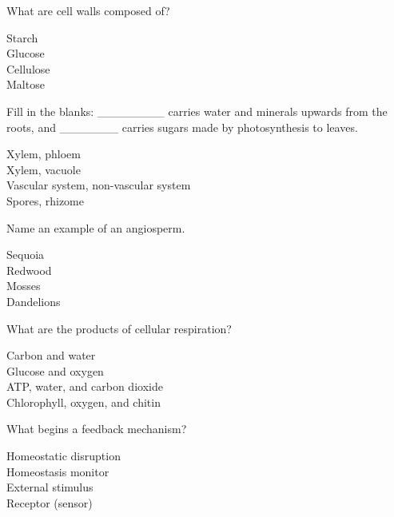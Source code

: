 \documentclass[a4paper,12pt]{exam}
\begin{document}
\begin{questions}
	\question What are cell walls composed of?
	
	\begin{oneparchoices}
		\choice Starch
		\\
		\choice Glucose
		\\
		\choice Cellulose
		\\
		\choice Maltose
	\end{oneparchoices}

	\question Fill in the blanks: \_\_\_\_\_\_\_\_  carries water and minerals upwards from the roots, and \_\_\_\_\_\_\_ carries sugars made by photosynthesis to leaves.
	
	\begin{oneparchoices}
		\choice Xylem, phloem
		\\
		\choice Xylem, vacuole
		\\
		\choice Vascular system, non-vascular system
		\\
		\choice Spores, rhizome
	\end{oneparchoices}

	
	\question Name an example of an angiosperm.
	
	\begin{oneparchoices}
		\choice Sequoia
		\\
		\choice Redwood
		\\
		\choice Mosses
		\\
		\choice Dandelions
	\end{oneparchoices}

	
	\question What are the products of cellular respiration?
	
	\begin{oneparchoices}
		\choice Carbon and water
		\\
		\choice Glucose and oxygen
		\\
		\choice ATP, water, and carbon dioxide
		\\
		\choice Chlorophyll, oxygen, and chitin
	\end{oneparchoices}
	
	\question What begins a feedback mechanism?
	
	\begin{oneparchoices}
		\choice Homeostatic disruption
		\\
		\choice Homeostasis monitor
		\\
		\choice External stimulus
		\\
		\choice Receptor (sensor)
	\end{oneparchoices}
\end{questions}
\end{document}
